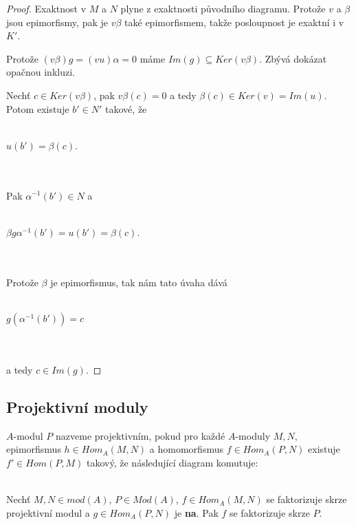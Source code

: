      \begin{proof}
       Exaktnost v $M$ a $N$ plyne z exaktnosti původního diagramu. 
       Protože $v$ a $\beta$ jsou epimorfismy, pak je $v\beta$ také epimorfismem, takže 
       posloupnost je exaktní i v $K'$. 
       
       Protože $(v\beta)g=(vu)\alpha=0$ máme $Im(g)\subseteq Ker(v\beta)$. Zbývá dokázat 
       opačnou inkluzi.
       
       Nechť $c\in Ker(v\beta)$, pak $v\beta(c)=0$ a tedy $\beta(c)\in 
       Ker(v)=Im(u)$. Potom existuje $b'\in N'$ takové, že \\\\
       \centerline{$u(b')=\beta(c)$.}\\\\
       Pak $\alpha^{-1}(b')\in N$ a
       \\\\
       \centerline{$\beta g \alpha^{-1}(b')=u(b')=\beta(c)$.}\\\\
       Protože $\beta$ je epimorfismus, tak nám tato úvaha dává
       \\\\
       \centerline{$g(\alpha^{-1}(b'))=c$}\\\\
       a tedy $c\in Im(g)$.
     \end{proof}
     
   \subsection{Projektivní moduly}
   
     \begin{dfn}
       $A$-modul $P$ nazveme projektivním, pokud pro každé $A$-moduly $M,N$, 
       epimorfismus $h\in Hom_A(M,N)$ a homomorfismus $f\in Hom_A(P,N)$ existuje 
       $f'\in Hom(P,M)$ takový, že následující diagram komutuje:\\\\
       \centerline{}
     \end{dfn}
   
     \begin{lem}\label{lem-faktorizuje-skrze-proj}
       Nechť $M,N\in mod(A)$, $P\in Mod(A)$, $f\in Hom_A(M,N)$ se faktorizuje skrze projektivní modul 
       a $g\in Hom_A(P,N)$ je \textbf{na}. Pak $f$ se faktorizuje skrze $P$.
     \end{lem}
     

